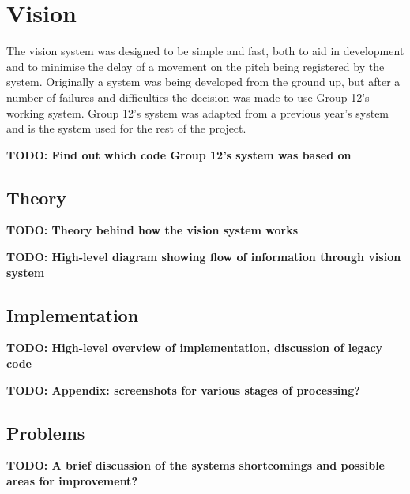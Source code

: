 \newcommand\visiontodo[1]{\textbf{TODO: #1}}

\section{Vision}

The vision system was designed to be simple and fast, both to aid in development and to minimise the delay of a movement on the
pitch being registered by the system. Originally a system was being developed from the ground up, but after a number of failures
and difficulties the decision was made to use Group 12's working system. Group 12's system was adapted from a previous year's
system and is the system used for the rest of the project.

\visiontodo{Find out which code Group 12's system was based on}

\subsection{Theory}

\visiontodo{Theory behind how the vision system works}

\visiontodo{High-level diagram showing flow of information through vision system}

\subsection{Implementation}

\visiontodo{High-level overview of implementation, discussion of legacy code}

\visiontodo{Appendix: screenshots for various stages of processing?}

\subsection{Problems}

\visiontodo{A brief discussion of the systems shortcomings and possible areas for improvement?}
